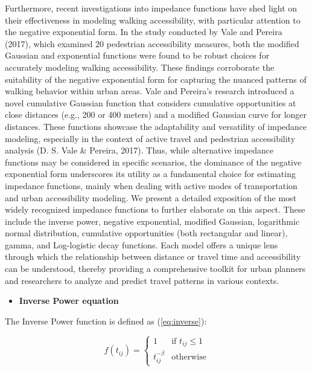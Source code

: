 \documentclass[
11pt, %
oneside, %
english, %
singlespacing, %
]{macthesis} %
\def\tightlist{}
\begin{document}
Furthermore, recent investigations into impedance functions have shed light on their effectiveness in modeling walking accessibility, with particular attention to the negative exponential form. In the study conducted by Vale and Pereira (2017), which examined 20 pedestrian accessibility measures, both the modified Gaussian and exponential functions were found to be robust choices for accurately modeling walking accessibility. These findings corroborate the suitability of the negative exponential form for capturing the nuanced patterns of walking behavior within urban areas. Vale and Pereira's research introduced a novel cumulative Gaussian function that considers cumulative opportunities at close distances (e.g., 200 or 400 meters) and a modified Gaussian curve for longer distances. These functions showcase the adaptability and versatility of impedance modeling, especially in the context of active travel and pedestrian accessibility analysis (D. S. Vale \& Pereira, 2017). Thus, while alternative impedance functions may be considered in specific scenarios, the dominance of the negative exponential form underscores its utility as a fundamental choice for estimating impedance functions, mainly when dealing with active modes of transportation and urban accessibility modeling. We present a detailed exposition of the most widely recognized impedance functions to further elaborate on this aspect. These include the inverse power, negative exponential, modified Gaussian, logarithmic normal distribution, cumulative opportunities (both rectangular and linear), gamma, and Log-logistic decay functions. Each model offers a unique lens through which the relationship between distance or travel time and accessibility can be understood, thereby providing a comprehensive toolkit for urban planners and researchers to analyze and predict travel patterns in various contexts.

\begin{itemize}
\tightlist
\item
  \textbf{Inverse Power equation}
\end{itemize}

The Inverse Power function is defined as (\eqref{eq:inverse}):

\begin{equation}
f(t_{ij}) =
\begin{cases}
  1 & \text{if } t_{ij} \le 1 \\
  t_{ij}^{-\beta} & \text{otherwise}
\end{cases}
\label{eq:inverse}
\end{equation}
\end{document}
